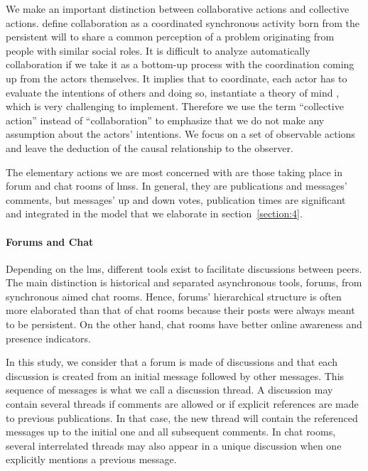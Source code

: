 \documentclass[a4paper,twoside]{article}
\begin{document}
We make an important distinction between collaborative actions and collective actions.  \cite{Dillenbourg1999} define collaboration as a coordinated synchronous activity born from the persistent will to share a common perception of a problem originating from people with similar social roles.  It is difficult to analyze automatically collaboration if we take it as a bottom-up process with the coordination coming up from the actors themselves.  It implies that to coordinate, each actor has to evaluate the intentions of others and doing so, instantiate a theory of mind \citep{Gerstenberg2017}, which is very challenging to implement.  Therefore we use the term ``collective action'' instead of ``collaboration'' to emphasize that we do not make any assumption about the actors' intentions.  We focus on a set of observable actions and leave the deduction of the causal relationship to the observer.

The elementary actions we are most concerned with are those taking place in forum and chat rooms of \glspl{lms}.  In general, they are publications and messages' comments, but messages' up and down votes, publication times are significant and integrated in the model that we elaborate in section~\ref{section:4}.

\paragraph{Forums and Chat}

Depending on the \gls{lms}, different tools exist to facilitate discussions between peers. The main distinction is historical and separated asynchronous tools, forums, from synchronous aimed chat rooms.  Hence, forums' hierarchical structure is often more elaborated than that of chat rooms because their posts were always meant to be persistent.  On the other hand, chat rooms have better online awareness and presence indicators.

In this study, we consider that a forum is made of discussions and that each discussion is created from an initial message followed by other messages.  This sequence of messages is what we call a discussion thread.  A discussion may contain several threads if comments are allowed or if explicit references are made to previous publications.   In that case, the new thread will contain the referenced messages up to the initial one and all subsequent comments.  In chat rooms, several interrelated threads may also appear in a unique discussion when one explicitly mentions a previous message.
\end{document}
